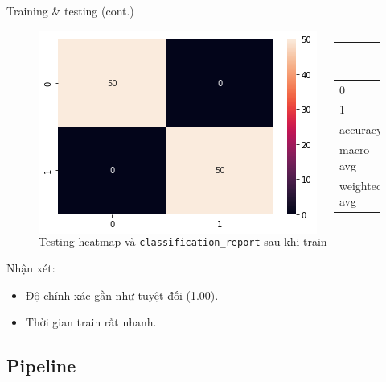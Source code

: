 \documentclass[aspectratio=169,xcolor=dvipsnames]{beamer}
\begin{document}
\begin{frame}{Training \& testing (cont.)}
\begin{figure}
\begin{columns}[c]
\includegraphics[width=0.9\linewidth]{img/train-result.png}

\begin{table}
\begin{tabular}{l l l l l}
\toprule
 & precision & recall & f1-score & support \\
\midrule
0 & 1.00 & 1.00 & 1.00 & 50 \\
1 & 1.00 & 1.00 & 1.00 & 50 \\
accuracy &   &   & 1.00 & 100 \\
macro avg & 1.00 & 1.00 & 1.00 & 100 \\
weighted avg & 1.00 & 1.00 & 1.00 & 100 \\
\bottomrule
\end{tabular}
\end{table}
\end{columns}
\caption{Testing heatmap và \texttt{classification\_report} sau khi train}
\end{figure}
Nhận xét: 
\begin{itemize}
    \item Độ chính xác gần như tuyệt đối (1.00).
    \item Thời gian train rất nhanh.
\end{itemize}
\end{frame}

\subsection{Pipeline}
\end{document}

